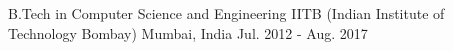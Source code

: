 

\begin{cventries}

  \cvedu
    {B.Tech in Computer Science and Engineering} %
    {IITB (Indian Institute of Technology Bombay)} %
    {Mumbai, India} %
    {Jul. 2012 -  Aug. 2017} %
  

\end{cventries}